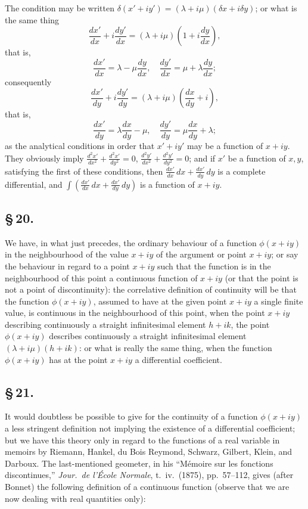 \documentclass[11pt,a4paper]{book}
\begin{document}
The condition may be written $\delta(x' + iy') = (\lambda + i\mu)(\delta x + i\delta y)$; or what is the same thing
\[
\frac{dx'}{dx} + i\frac{dy'}{dx} = (\lambda + i\mu)\left(1 + i\frac{dy}{dx}\right),
\]
that is,
\[
\frac{dx'}{dx} = \lambda - \mu\frac{dy}{dx}, \quad \frac{dy'}{dx} = \mu + \lambda\frac{dy}{dx};
\]
consequently
\[
\frac{dx'}{dy} + i\frac{dy'}{dy} = (\lambda + i\mu)\left(\frac{dx}{dy} + i\right),
\]
that is,
\[
\frac{dx'}{dy} = \lambda\frac{dx}{dy} - \mu, \quad \frac{dy'}{dy} = \mu\frac{dx}{dy} + \lambda;
\]
as the analytical conditions in order that $x' + iy'$ may be a function of $x + iy$. They obviously imply $\frac{d^{2}x'}{dx^{2}} + \frac{d^{2}x'}{dy^{2}} = 0$, $\frac{d^{2}y'}{dx^{2}} + \frac{d^{2}y'}{dy^{2}} = 0$; and if $x'$ be a function of $x, y$, satisfying the first of these conditions, then $\frac{dx'}{dx}\,dx + \frac{dx'}{dy}\,dy$ is a complete differential, and $\int\left(\frac{dx'}{dx}\,dx + \frac{dx'}{dy}\,dy\right)$ is a function of $x + iy$.

\subsection*{\S\,20.}

We have, in what just precedes, the ordinary behaviour of a function $\phi(x + iy)$ in the neighbourhood of the value $x + iy$ of the argument or point $x + iy$; or say the behaviour in regard to a point $x + iy$ such that the function is in the neighbourhood of this point a continuous function of $x + iy$ (or that the point is not a point of discontinuity): the correlative definition of continuity will be that the function $\phi(x + iy)$, assumed to have at the given point $x + iy$ a single finite value, is continuous in the neighbourhood of this point, when the point $x + iy$ describing continuously a straight infinitesimal element $h + ik$, the point $\phi(x + iy)$ describes continuously a straight infinitesimal element $(\lambda + i\mu)(h + ik)$: or what is really the same thing, when the function $\phi(x + iy)$ has at the point $x + iy$ a differential coefficient.

\subsection*{\S\,21.}

It would doubtless be possible to give for the continuity of a function $\phi(x + iy)$ a less stringent definition not implying the existence of a differential coefficient; but we have this theory only in regard to the functions of a real variable in memoirs by Riemann, Hankel, du Bois Reymond, Schwarz, Gilbert, Klein, and Darboux. The last-mentioned geometer, in his ``M\'{e}moire sur les fonctions discontinues,'' \textit{Jour.\ de l'\'{E}cole Normale}, t.~iv.\ (1875), pp.~57--112, gives (after Bonnet) the following definition of a continuous function (observe that we are now dealing with real quantities only):
\end{document}
